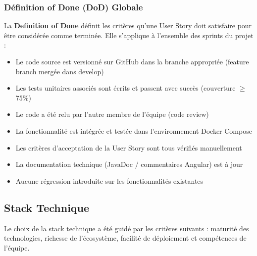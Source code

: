 \documentclass[12pt,a4paper]{report}
\begin{document}
\subsubsection{Définition of Done (DoD) Globale}

La \textbf{Definition of Done} définit les critères qu'une User Story doit satisfaire pour être considérée comme terminée. Elle s'applique à l'ensemble des sprints du projet :

\begin{itemize}[itemsep=0.4em]
    \item  Le code source est versionné sur GitHub dans la branche appropriée (feature branch mergée dans develop)
    \item  Les tests unitaires associés sont écrits et passent avec succès (couverture $\geq$ 75\%)
    \item  Le code a été relu par l'autre membre de l'équipe (code review)
    \item  La fonctionnalité est intégrée et testée dans l'environnement Docker Compose
    \item  Les critères d'acceptation de la User Story sont tous vérifiés manuellement
    \item  La documentation technique (JavaDoc / commentaires Angular) est à jour
    \item  Aucune régression introduite sur les fonctionnalités existantes
\end{itemize}

\subsection{Stack Technique}

Le choix de la stack technique a été guidé par les critères suivants : maturité des technologies, richesse de l'écosystème, facilité de déploiement et compétences de l'équipe.
\end{document}
